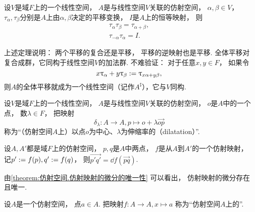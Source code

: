 \begin{theorem}%
设\(V\)是域\(F\)上的一个线性空间，
\(A\)是与线性空间\(V\)关联的仿射空间，
\(\alpha,\beta \in V\)，
\(\tau_\alpha,\tau_\beta\)分别是\(A\)上由\(\alpha,\beta\)决定的平移变换，
\(I\)是\(A\)上的恒等映射，
则\begin{gather*}
	\tau_\alpha \tau_\beta = \tau_{\alpha + \beta}, \\
	\tau_{-\alpha} \tau_\alpha = I.
\end{gather*}
\end{theorem}
\begin{remark}
上述定理说明：
两个平移的复合还是平移，
平移的逆映射也是平移.
全体平移对复合成群，它同构于线性空间\(V\)的加法群.
不难验证：
对于任意\(x,y \in F\)，
如果令\begin{equation*}
	x \uptau_\alpha + y \uptau_\beta
	:= \uptau_{x \alpha + y \beta},
\end{equation*}
则\(A\)的全体平移就成为一个线性空间（记作\(A^\sharp\)），它与\(V\)同构.
\end{remark}

\begin{definition}%
设\(V\)是域\(F\)上的一个线性空间，
\(A\)是与线性空间\(V\)关联的仿射空间，
\(o\)是\(A\)中的一个点，
数\(\lambda \in F\)，
把映射\begin{equation*}
	\delta_\lambda\colon A \to A,
	p \mapsto o + \lambda\vec{op}
\end{equation*}
称为“（仿射空间\(A\)上）以点\(o\)为中心、\(\lambda\)为伸缩率的（dilatation）”.
\end{definition}

\begin{proposition}\label{theorem:仿射空间.仿射映射的微分的唯一性}
设\(A,A'\)都是域\(F\)上的仿射空间，
\(p,q\)是\(A\)中两点，
\(f\)是从\(A\)到\(A'\)的一个仿射映射，
记\(p' := f(p), q' := f(q)\)，
则\(
	\vec{p'q'}
	= \dd{f}(\vec{pq})
\).
\end{proposition}
\begin{remark}
由\cref{theorem:仿射空间.仿射映射的微分的唯一性} 可以看出，
仿射映射的微分存在且唯一.
\end{remark}

\begin{definition}%
设\(A\)是一个仿射空间，
点\(a \in A\).
把映射\(f\colon A \to A, x \mapsto a\)
称为“仿射空间\(A\)上的”.
\end{definition}


